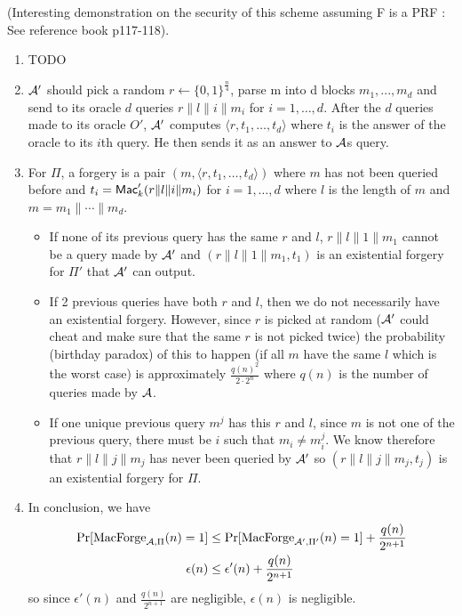 \begin{solution}
  (Interesting demonstration on the security of this scheme assuming F is a PRF : See reference book p117-118).
  \begin{enumerate}
    \item TODO
    \item $\mathcal{A}'$ should pick a random $r\leftarrow \{0,1\}^{\frac{n}{4}}$, parse m into d blocks $m_1,...,m_d$ and send to its oracle $d$ queries $r\|l\|i\|m_i$ for $i = 1, \ldots, d$.
      After the $d$ queries made to its oracle $O'$, $\mathcal{A}'$ computes $\langle r, t_1, \ldots, t_d \rangle$ where $t_i$ is the answer of the oracle to its $i$th query. He then sends it as an answer to $\mathcal{A}$s query.
    \item For $\Pi$, a forgery is a pair $(m, \langle r, t_1, \ldots, t_d \rangle)$ where $m$ has not been queried before
      and $t_i = \operatorname{\mathsf{Mac}}'_k(r\|l\|i\|m_i)$ for $i = 1, \ldots, d$ where $l$ is the length of $m$ and $m = m_1\| \cdots \|m_d$.
      \begin{itemize}
        \item
          If none of its previous query has the same $r$ and $l$, $r\|l\|1\|m_1$ cannot be a query made by $\mathcal{A}'$ and
          $(r\|l\|1\|m_1, t_1)$ is an existential forgery for $\Pi'$ that $\mathcal{A}'$ can output.
        \item
          If 2 previous queries have both $r$ and $l$, then we do not necessarily have an existential forgery.
          However, since $r$ is picked at random ($\mathcal{A}'$ could cheat and make sure that the same $r$ is not picked twice)
          the probability (birthday paradox) of this to happen (if all $m$ have the same $l$ which is the worst case) is approximately
          $\frac{q(n)^2}{2 \cdot 2^n}$ where $q(n)$ is the number of queries made by $\mathcal{A}$.
        \item
          If one unique previous query $m^j$ has this $r$ and $l$, since $m$ is not one of the previous query, there must be $i$
          such that $m_i \neq m_i^j$.
          We know therefore that $r\|l\|j\|m_j$ has never been queried by $\mathcal{A}'$ so $(r\|l\|j\|m_j, t_j)$ is an existential forgery for $\Pi$.
      \end{itemize}
    \item In conclusion, we have
      \begin{align*}
        \Pr[\operatorname{MacForge}_{\mathcal{A},\Pi}(n) = 1]
        & \leq \Pr[\operatorname{MacForge}_{\mathcal{A}',\Pi'}(n) = 1] + \frac{q(n)}{2^{n+1}}\\
        \epsilon(n)
        & \leq \epsilon'(n) + \frac{q(n)}{2^{n+1}}
      \end{align*}
      so since $\epsilon'(n)$ and $\frac{q(n)}{2^{n+1}}$ are negligible,
      $\epsilon(n)$ is negligible.
  \end{enumerate}
\end{solution}

